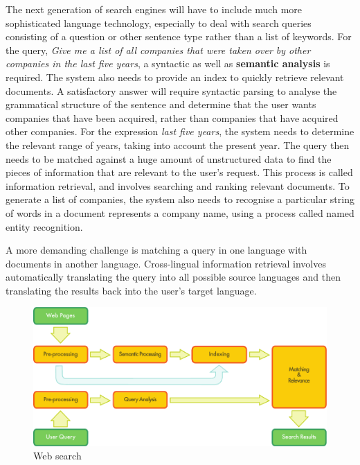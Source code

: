 \begin{multicols}{2}

  The next generation of search engines will have to include much more sophisticated language technology, especially to deal with search queries consisting of a question or other sentence type rather than a list of keywords. For the query, \textit{Give me a list of all companies that were taken over by other companies in the last five years}, a syntactic as well as \textbf{semantic analysis} is required. The system also needs to provide an index to quickly retrieve relevant documents. A satisfactory answer will require syntactic parsing to analyse the grammatical structure of the sentence and determine that the user wants companies that have been acquired, rather than companies that have acquired other companies. For the expression \textit{last five years}, the system needs to determine the relevant range of years, taking into account the present year. The query then needs to be matched against a huge amount of unstructured data to find the pieces of information that are relevant to the user’s request. This process is called information retrieval, and involves searching and ranking relevant documents. To generate a list of companies, the system also needs to recognise a particular string of words in a document represents a company name, using a process called named entity recognition.

  A more demanding challenge is matching a query in one language with documents in another language. Cross-lingual information retrieval involves automatically translating the query into all possible source languages and then translating the results back into the user's target language.

  \begin{figure}[htb]
    \center
    \includegraphics[width=\textwidth]{../_media/english/web_search_architecture}
    \caption{Web search}
    \label{fig:websearcharch_en}
   \end{figure}


\end{multicols}
